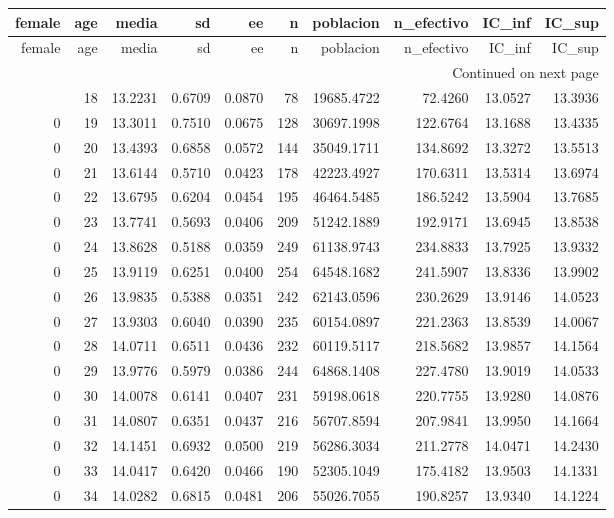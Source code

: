 \begin{longtable}{rrrrrrrrrr}
\toprule
female & age & media & sd & ee & n & poblacion & n\_efectivo & IC\_inf & IC\_sup \\
\midrule
\endfirsthead
\toprule
female & age & media & sd & ee & n & poblacion & n\_efectivo & IC\_inf & IC\_sup \\
\midrule
\endhead
\midrule
\multicolumn{10}{r}{Continued on next page} \\
\midrule
\endfoot
\bottomrule
\endlastfoot
0 & 18 & 13.2231 & 0.6709 & 0.0870 & 78 & 19685.4722 & 72.4260 & 13.0527 & 13.3936 \\
0 & 19 & 13.3011 & 0.7510 & 0.0675 & 128 & 30697.1998 & 122.6764 & 13.1688 & 13.4335 \\
0 & 20 & 13.4393 & 0.6858 & 0.0572 & 144 & 35049.1711 & 134.8692 & 13.3272 & 13.5513 \\
0 & 21 & 13.6144 & 0.5710 & 0.0423 & 178 & 42223.4927 & 170.6311 & 13.5314 & 13.6974 \\
0 & 22 & 13.6795 & 0.6204 & 0.0454 & 195 & 46464.5485 & 186.5242 & 13.5904 & 13.7685 \\
0 & 23 & 13.7741 & 0.5693 & 0.0406 & 209 & 51242.1889 & 192.9171 & 13.6945 & 13.8538 \\
0 & 24 & 13.8628 & 0.5188 & 0.0359 & 249 & 61138.9743 & 234.8833 & 13.7925 & 13.9332 \\
0 & 25 & 13.9119 & 0.6251 & 0.0400 & 254 & 64548.1682 & 241.5907 & 13.8336 & 13.9902 \\
0 & 26 & 13.9835 & 0.5388 & 0.0351 & 242 & 62143.0596 & 230.2629 & 13.9146 & 14.0523 \\
0 & 27 & 13.9303 & 0.6040 & 0.0390 & 235 & 60154.0897 & 221.2363 & 13.8539 & 14.0067 \\
0 & 28 & 14.0711 & 0.6511 & 0.0436 & 232 & 60119.5117 & 218.5682 & 13.9857 & 14.1564 \\
0 & 29 & 13.9776 & 0.5979 & 0.0386 & 244 & 64868.1408 & 227.4780 & 13.9019 & 14.0533 \\
0 & 30 & 14.0078 & 0.6141 & 0.0407 & 231 & 59198.0618 & 220.7755 & 13.9280 & 14.0876 \\
0 & 31 & 14.0807 & 0.6351 & 0.0437 & 216 & 56707.8594 & 207.9841 & 13.9950 & 14.1664 \\
0 & 32 & 14.1451 & 0.6932 & 0.0500 & 219 & 56286.3034 & 211.2778 & 14.0471 & 14.2430 \\
0 & 33 & 14.0417 & 0.6420 & 0.0466 & 190 & 52305.1049 & 175.4182 & 13.9503 & 14.1331 \\
0 & 34 & 14.0282 & 0.6815 & 0.0481 & 206 & 55026.7055 & 190.8257 & 13.9340 & 14.1224 \\

\end{longtable}
